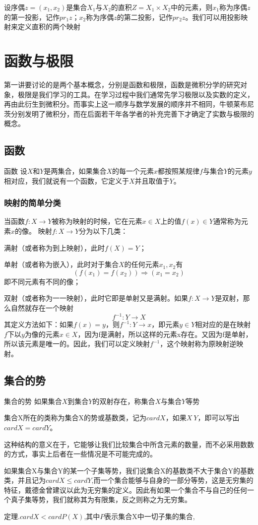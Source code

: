 设序偶$z=(x_1,x_2)$是集合$X_1$与$X_2$的直积$Z=X_1\times X_2$中的元素，则$x_1$称为序偶$z$的第一投影，记作$pr_1z$；$x_2$称为序偶$z$的第二投影，记作$pr_2z$。我们可以用投影映射来定义直积的两个映射


\section{函数与极限}
第一讲要讨论的是两个基本概念，分别是函数和极限，函数是微积分学的研究对象，极限是我们学习的工具。在学习过程中我们通常先学习极限以及实数的定义，再由此衍生到微积分。而事实上这一顺序与数学发展的顺序并不相同，牛顿莱布尼茨分别发明了微积分，而在后面若干年各学者的补充完善下才确定了实数与极限的概念。
\subsection{函数}
\begin{definition}{函数}{}
设$X$和$Y$是两集合，如果集合$X$的每一个元素$x$都按照某规律$f$与集合$Y$的元素$y$相对应，我们就说有一个函数，它定义于$X$并且取值于$Y$。
\end{definition}
\subsubsection{映射的简单分类}
当函数$f:X\rightarrow Y$被称为映射的时候，它在元素$x\in X$上的值$f(x)\in Y$通常称为元素$x$的像。
映射$f:X\rightarrow Y$分为以下几类：

满射（或者称为到上映射），此时$f(X)=Y$；

单射（或者称为嵌入），此时对于集合$X$的任何元素$x_1,x_2$有
\[(f(x_1)=f(x_2))\Rightarrow (x_1=x_2)\]
即不同元素有不同的像；

双射（或者称为一一映射），此时它即是单射又是满射。如果$f:X\rightarrow Y$是双射，那么自然就存在一个映射
\[f^{-1}:Y\rightarrow X\]
其定义方法如下：如果$f(x)=y$，则$f^{-1}:Y\rightarrow x$，即元素$y\in Y$相对应的是在映射$f$下以$y$为像的元素$x\in X$，因为f是满射，所以这样的元素x存在。又因为f是单射，所以该元素是唯一的。因此，我们可以定义映射$f^{-1}$，这个映射称为原映射逆映射。
\subsection{集合的势}
\begin{definition}{集合的势}{}
如果集合$X$到集合$Y$的双射存在，称集合$X$与集合$Y$等势
\end{definition}
集合X所在的类称为集合X的势或基数类，记为$cardX$，如果$X~Y$，即可以写出$cardX=cardY$。

这种结构的意义在于，它能够让我们比较集合中所含元素的数量，而不必采用数数的方式，事实上后者在一些情况是不可能完成的。

如果集合X与集合Y的某一个子集等势，我们说集合X的基数类不大于集合Y的基数类，并且记为$cardX\leq cardY$,而一个集合能够与自身的一部分等势，这是无穷集的特征，戴德金曾建议以此为无穷集的定义。因此有如果一个集合不与自己的任何一个真子集等势，我们就称其为有限集，反之则称之为无穷集。

定理.$cardX<cardP(X)$,其中$P$表示集合X中一切子集的集合,